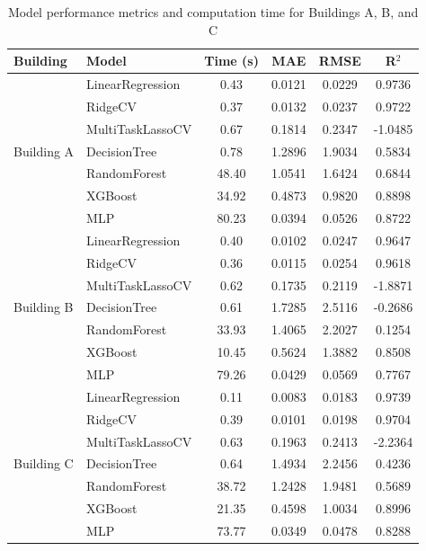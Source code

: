 
\begin{table}[h!]
    \centering
    \caption{Model performance metrics and computation time for Buildings A, B, and C}
    \label{tab:buildings_cv_results}
    \begin{tabular}{llcccc}
    \hline
    \textbf{Building} & \textbf{Model} & \textbf{Time (s)} & \textbf{MAE} & \textbf{RMSE} & \textbf{R$^2$} \\ \hline
\multirow{7}{*}{Building A}& LinearRegression & 0.43 & 0.0121 & 0.0229 & 0.9736 \\
& RidgeCV & 0.37 & 0.0132 & 0.0237 & 0.9722 \\
& MultiTaskLassoCV & 0.67 & 0.1814 & 0.2347 & -1.0485 \\
& DecisionTree & 0.78 & 1.2896 & 1.9034 & 0.5834 \\
& RandomForest & 48.40 & 1.0541 & 1.6424 & 0.6844 \\
& XGBoost & 34.92 & 0.4873 & 0.9820 & 0.8898 \\
& MLP & 80.23 & 0.0394 & 0.0526 & 0.8722 \\
\hline
\multirow{7}{*}{Building B}& LinearRegression & 0.40 & 0.0102 & 0.0247 & 0.9647 \\
& RidgeCV & 0.36 & 0.0115 & 0.0254 & 0.9618 \\
& MultiTaskLassoCV & 0.62 & 0.1735 & 0.2119 & -1.8871 \\
& DecisionTree & 0.61 & 1.7285 & 2.5116 & -0.2686 \\
& RandomForest & 33.93 & 1.4065 & 2.2027 & 0.1254 \\
& XGBoost & 10.45 & 0.5624 & 1.3882 & 0.8508 \\
& MLP & 79.26 & 0.0429 & 0.0569 & 0.7767 \\
\hline
\multirow{7}{*}{Building C}& LinearRegression & 0.11 & 0.0083 & 0.0183 & 0.9739 \\
& RidgeCV & 0.39 & 0.0101 & 0.0198 & 0.9704 \\
& MultiTaskLassoCV & 0.63 & 0.1963 & 0.2413 & -2.2364 \\
& DecisionTree & 0.64 & 1.4934 & 2.2456 & 0.4236 \\
& RandomForest & 38.72 & 1.2428 & 1.9481 & 0.5689 \\
& XGBoost & 21.35 & 0.4598 & 1.0034 & 0.8996 \\
& MLP & 73.77 & 0.0349 & 0.0478 & 0.8288 \\
\hline

    \end{tabular}
\end{table}
